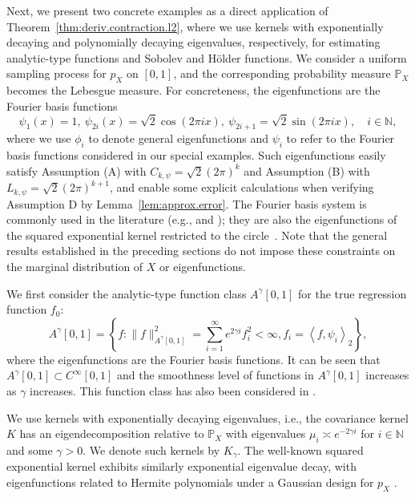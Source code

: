\documentclass[12pt]{article}
\newcommand{\PP}{\mathbb{P}}
\newcommand{\s}{\sum_{i=1}^{\infty}}
\theoremstyle{plain}
\theoremstyle{nonitalicremark}
\begin{document}
Next, we present two concrete examples as a direct application of Theorem~\ref{thm:deriv.contraction.l2}, where we use kernels with exponentially decaying and polynomially decaying eigenvalues, respectively, for estimating analytic-type functions and Sobolev and H\"older functions. We consider a uniform sampling process for $p_X$ on $[0,1]$, and the corresponding probability measure $\PP_X$ becomes the Lebesgue measure. For concreteness, the eigenfunctions are the Fourier basis functions
\begin{equation}\label{eq:fourier}
\psi_1(x)=1,\ \psi_{2i}(x)=\sqrt{2}\cos(2\pi ix),\ \psi_{2i+1}=\sqrt{2}\sin(2\pi ix),\quad i\in\mathbb{N}, 
\end{equation}
where we use $\phi_i$ to denote general eigenfunctions and $\psi_i$ to refer to the Fourier basis functions considered in our special examples. Such eigenfunctions easily satisfy Assumption (A) with $C_{k,\psi}=\sqrt{2}(2\pi)^k$ and Assumption (B) with $L_{k,\psi} = \sqrt{2}(2\pi)^{k+1}$, and enable some explicit calculations when verifying Assumption D by Lemma~\ref{lem:approx.error}. The Fourier basis system is commonly used in the literature (e.g., \cite{van2011information} and \cite{yang2017frequentist}); they are also the eigenfunctions of the squared exponential kernel restricted to the circle~\citep{Li+Ghosal:17}. Note that the general results established in the preceding sections do not impose these constraints on the marginal distribution of $X$ or eigenfunctions.

We first consider the analytic-type function class $A^\gamma[0,1]$ for the true regression function $f_0$:
\begin{equation}
A^\gamma[0,1]=\left\{f: \|f\|^2_{A^\gamma[0,1]}= \s e^{2\gamma i}f_i^2<\infty,f_i=\left<f,\psi_i\right>_2\right\},
\end{equation}
where the eigenfunctions are the Fourier basis functions. It can be seen that $A^\gamma[0,1] \subset C^\infty[0,1]$ and the smoothness level of functions in $A^\gamma[0,1]$ increases as $\gamma$ increases. This function class has also been considered in \cite{van2011information}.



We use kernels with exponentially decaying eigenvalues, i.e., the covariance kernel $K$ has an eigendecomposition relative to $\PP_X$ with eigenvalues $\mu_i\asymp e^{-2\gamma i}$ for $i\in\mathbb{N}$ and some $\gamma>0$. We denote such kernels by $K_\gamma$.  The well-known squared exponential kernel exhibits similarly exponential eigenvalue decay, with eigenfunctions related to Hermite polynomials under a Gaussian design for $p_X$ \cite[Chapter~7]{pati2015adaptive,rasmussen2006}.
\end{document}
